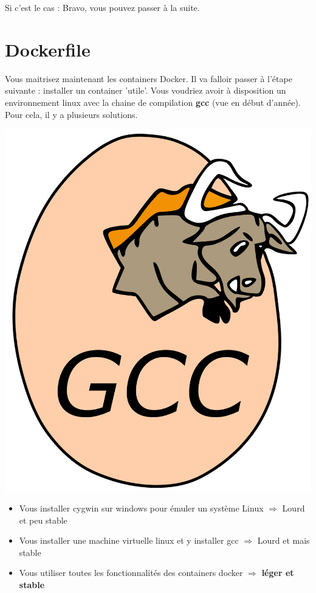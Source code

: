 \documentclass[french, 12pt]{article}%
\newcommand{\itemE}{\item[$\bullet$]}
\begin{document}
Si c'est le cas : Bravo, vous pouvez passer à la suite.


\section{Dockerfile}




\begin{minipage}{0.6\linewidth}
Vous maitrisez maintenant les containers Docker. Il va falloir passer à l'étape suivante : installer un container 'utile'. Vous voudriez avoir à disposition un environnement linux avec la chaine de compilation \textbf{gcc} (vue en début d'année). Pour cela, il y a plusieurs solutions.  

\end{minipage}
\begin{minipage}{0.39\linewidth}
\begin{center}
\includegraphics[scale=0.05]{./ressource/gcc}
\end{center}
\end{minipage}
\begin{itemize}
\itemE Vous installer cygwin sur windows pour émuler un système Linux $\Rightarrow$ Lourd et peu stable
\itemE Vous installer une machine virtuelle linux et y installer gcc  $\Rightarrow$ Lourd et mais stable
\itemE Vous utiliser toutes les fonctionnalités des containers docker $\Rightarrow$ \textbf{léger et stable}
\end{itemize}
\end{document}
